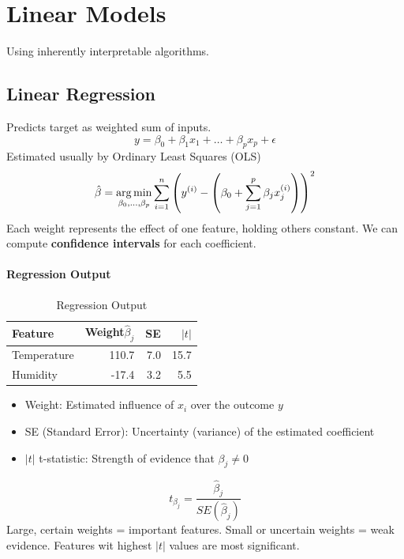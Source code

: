 \section{Linear Models}
Using inherently interpretable algorithms.
\subsection{Linear Regression}
Predicts target as weighted sum of inputs.
\begin{equation}
	y = \beta_0 + \beta_1 x_1 + \dots + \beta_p x_p + \epsilon
	\label{eq:linear_regression}
\end{equation}
Estimated usually by Ordinary Least Squares (OLS)
\begin{equation}
	\hat \beta = \mathop{\arg\min}\limits_{\beta_0, \dots , \beta_p} \sum_{i=1}^n \left (y^{(i)} - \left (\beta_0 + \sum_{j=1}^p\beta_jx_j^{(i)}\right)\right)^{2}
	\label{eq:OLS}
\end{equation}
Each weight represents the effect of one feature, holding others constant.
We can compute \textbf{confidence intervals} for each coefficient.
\paragraph{Regression Output}
\begin{table}[H]
	\caption{Regression Output}\label{tab:regression_output}
	\begin{center}
		\begin{tabular}{l|r|r|r}
			\hline
			Feature     & Weight$\hat \beta_j$ & SE  & $|t|$ \\
			\hline
			Temperature & 110.7                & 7.0 & 15.7  \\
			Humidity    & -17.4                & 3.2 & 5.5   \\
			\hline
		\end{tabular}
	\end{center}
\end{table}
\begin{itemize}
	\item Weight: Estimated influence of $x_i$ over the outcome $y$
	\item SE (Standard Error): Uncertainty (variance) of the estimated coefficient
	\item $|t|$ t-statistic: Strength of evidence that $\beta_j \neq 0$
\end{itemize}
\begin{equation}
	t_{\beta_j} = \frac{\hat \beta_j}{SE(\hat \beta_j)}
	\label{eq:t-statistic}
\end{equation}
Large, certain weights = important features. Small or uncertain weights = weak evidence. Features wit highest $|t|$ values are most significant.

